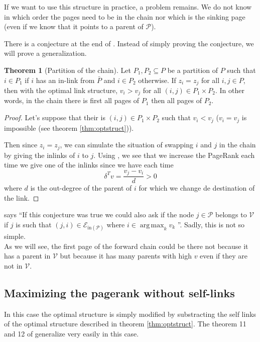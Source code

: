 \documentclass{article}
\DeclareMathOperator*{\argmax}{arg\,max}
\newcommand{\1}{\mathbf{1}}
\theoremstyle{definition}
\newtheorem{mytheo}[mydef]{Theorem}
\begin{document}
If we want to use this structure in practice, a problem remains.
We do not know in which order the pages need to be in the chain
nor which is the sinking page (even if we know that it points to a parent of $\mathcal{P}$).

There is a conjecture at the end of \cite{de2008maximizing}.
Instead of simply proving the conjecture, we will prove a generalization.
\begin{mytheo}[Partition of the chain]
  \label{theo:partition}
  Let $P_1,P_2 \subseteq P$ be a partition of $P$ such that
  $i \in P_1$ if $i$ has an in-link from $\bar{P}$ and $i \in P_2$
  otherwise.
  If $z_i = z_j$ for all $i,j \in P$,
  then with the optimal link structure,
  $v_i > v_j$ for all $(i,j) \in P_1 \times P_2$.
  In other words, in the chain there is first all pages of
  $P_1$ then all pages of $P_2$.
  \begin{proof}
    Let's suppose that their is $(i,j) \in P_1 \times P_2$
    such that $v_i < v_j$ ($v_i = v_j$ is impossible (see theorem \ref{thm:optstruct})).

    Then since $z_i = z_j$, we can simulate the situation of swapping $i$ and $j$ in the chain
    by giving the inlinks of $i$ to $j$.
    Using \cite[theorem~5]{de2008maximizing}, we see that we increase the PageRank each time we give one of the inlinks since
    we have each time
    \[ \delta^Tv = \frac{v_j - v_i}{d} > 0 \]
    where $d$ is the out-degree of the parent of $i$ for which we change de destination of the link.
  \end{proof}
\end{mytheo}

\cite{de2008maximizing} says
``If this conjecture was true we could also ask if the node $j \in \mathcal{P}$ belongs to $\mathcal{V}$ if $j$ is such that
$(j, i) \in \mathcal{E}_{\text{in}(\mathcal{P})}$ where $i \in \argmax_k v_k$ ''.
Sadly, this is not so simple. \\
As we will see, the first page of the forward chain could be there not
because it has a parent in $\mathcal{V}$ but because it has many parents with high $v$ even if they are not in $\mathcal{V}$.

\subsection{Maximizing the pagerank without self-links}
In this case the optimal structure is simply modified by substracting the self links of the optimal structure described in theorem \ref{thm:optstruct}. The theorem 11 and 12 of \cite{de2008maximizing} generalize very easily in this case.
\end{document}
